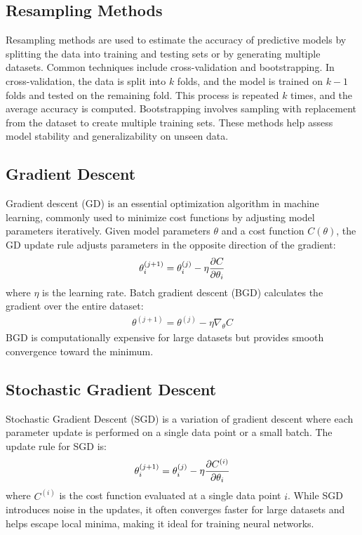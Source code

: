 \documentclass[%
reprint,
amsmath,amssymb,
aps,
]{revtex4-2}
\begin{document}
\subsection{Resampling Methods}
Resampling methods are used to estimate the accuracy of predictive models by splitting the data into training and testing sets or by generating multiple datasets. Common techniques include cross-validation and bootstrapping. In cross-validation, the data is split into $k$ folds, and the model is trained on $k-1$ folds and tested on the remaining fold. This process is repeated $k$ times, and the average accuracy is computed. Bootstrapping involves sampling with replacement from the dataset to create multiple training sets. These methods help assess model stability and generalizability on unseen data.

\subsection{Gradient Descent}
Gradient descent (GD) is an essential optimization algorithm in machine learning, commonly used to minimize cost functions by adjusting model parameters iteratively. Given model parameters $\theta$ and a cost function $C(\theta)$, the GD update rule adjusts parameters in the opposite direction of the gradient:
\begin{align}
	\theta_i^{(j+1)}=\theta_i^{(j)}-\eta\pdv{C}{\theta_i}
\end{align}
where $\eta$ is the learning rate. Batch gradient descent (BGD) calculates the gradient over the entire dataset:
\begin{align}
	\theta^{(j+1)}=\theta^{(j)}-\eta\nabla_\theta C
\end{align}
BGD is computationally expensive for large datasets but provides smooth convergence toward the minimum.

\subsection{Stochastic Gradient Descent}
Stochastic Gradient Descent (SGD) is a variation of gradient descent where each parameter update is performed on a single data point or a small batch. The update rule for SGD is:
\[
\theta_i^{(j+1)} = \theta_i^{(j)} - \eta \pdv{C^{(i)}}{\theta_i}
\]
where $C^{(i)}$ is the cost function evaluated at a single data point $i$. While SGD introduces noise in the updates, it often converges faster for large datasets and helps escape local minima, making it ideal for training neural networks.
\end{document}
